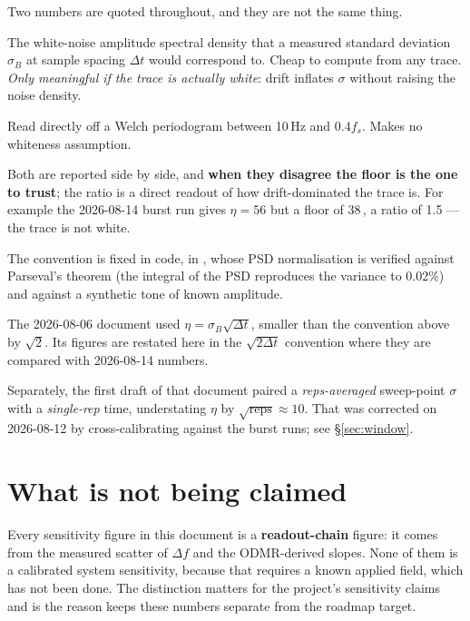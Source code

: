 Two numbers are quoted throughout, and they are not the same thing.

\begin{description}[style=nextline,leftmargin=1.2em]
  \item[$\eta = \sigma_B\sqrt{2\,\Delta t}$ --- the ``implied'' sensitivity]
  The white-noise amplitude spectral density that a measured standard deviation
  $\sigma_B$ at sample spacing $\Delta t$ would correspond to. Cheap to compute
  from any trace. \emph{Only meaningful if the trace is actually white}: drift
  inflates $\sigma$ without raising the noise density.
  \item[Measured floor --- the median ASD in the flat band]
  Read directly off a Welch periodogram between 10\,Hz and $0.4 f_s$. Makes no
  whiteness assumption.
\end{description}

Both are reported side by side, and \textbf{when they disagree the floor is the
one to trust}; the ratio is a direct readout of how drift-dominated the trace is.
For example the 2026-08-14 burst run gives $\eta = 56$ but a floor of
38\,\etaunit, a ratio of 1.5 --- the trace is not white.

The convention is fixed in code, in ,
whose PSD normalisation is verified against Parseval's theorem (the integral of
the PSD reproduces the variance to 0.02\%) and against a synthetic tone of known
amplitude.

\begin{retractbox}
The 2026-08-06 document used $\eta = \sigma_B\sqrt{\Delta t}$, smaller than the
convention above by $\sqrt{2}$. Its figures are restated here in the
$\sqrt{2\Delta t}$ convention where they are compared with 2026-08-14 numbers.

Separately, the first draft of that document paired a \emph{reps-averaged}
sweep-point $\sigma$ with a \emph{single-rep} time, understating $\eta$ by
$\sqrt{\text{reps}}\approx 10$. That was corrected on 2026-08-12 by
cross-calibrating against the burst runs; see \S\ref{sec:window}.
\end{retractbox}

\section{What is not being claimed}
\label{sec:notaclaim}

Every sensitivity figure in this document is a \textbf{readout-chain} figure: it
comes from the measured scatter of $\Delta f$ and the ODMR-derived slopes. None
of them is a calibrated system sensitivity, because that requires a known applied
field, which has not been done. The distinction matters for the project's
sensitivity claims and is the reason
 keeps these numbers separate from
the roadmap target.

